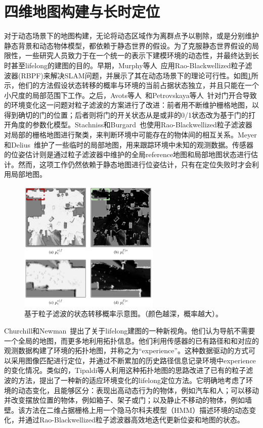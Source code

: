 \section{四维地图构建与长时定位}
\label{subsec:4Dmapping}
对于动态场景下的地图构建，无论将动态区域作为离群点予以剔除，或是分别维护静态背景和动态物体模型，都依赖于静态世界的假设。为了克服静态世界假设的局限性，一些研究人员致力于在一个统一的表示下建模环境的动态性，并最终达到长时甚至lifelong的建图的目的。早期，Murphy等人~\cite{Murphy1999Bayesian}应用Rao-Blackwellized粒子滤波器(RBPF)来解决SLAM问题，并展示了其在动态场景下的理论可行性。如图\ref{fig:State transition probabilities}所示，他们的方法假设状态转移的概率与环境的当前占据状态独立，并且只能在一个小尺度的局部范围下工作。之后，Avots等人~\cite{Avots2002A}和Petrovskaya等人~\cite{Petrovskaya2007Probabilistic}针对门开合导致的环境变化这一问题对粒子滤波的方案进行了改进：前者用不断维护栅格地图，以得到确切的门的位置；后者则将门的开关状态从是或非的0/1状态改为基于门的打开角度的参数化模型。Stachniss和Burgard~\cite{Stachniss2005Mobile}也使用Rao-Blackwellized粒子滤波器对局部的栅格地图进行聚类，来判断环境中可能存在的物体间的相互关系。Meyer和Delius~\cite{Meyer2010Temporary}维护了一些临时的局部地图，用来跟踪环境中未知的观测数据。传感器的位姿估计则是通过粒子滤波器中维护的全局reference地图和局部地图状态进行估计。然而，这项工作仍然依赖于静态地图进行位姿估计，只有在定位失败时才会利用局部地图。

\begin{figure}[htbp]
	\centering
	\includegraphics[width=0.6\textwidth]{figs/2-3/filter.png}
	\caption{基于粒子滤波的状态转移概率示意图。（颜色越深，概率越大）。}
	\label{fig:State transition probabilities}
\end{figure}

Churchill和Newman~\cite{Churchill2012Practice}提出了关于lifelong建图的一种新视角。他们认为导航不需要一个全局的地图，而更多地利用拓扑信息。他们利用传感器的已有路径和和对应的观测数据构建了环境的拓扑地图，并称之为“experience”。这种数据驱动的方式可以采用图像匹配进行定位，并通过不断累加的历史路径信息记录环境中experience的变化情况。类似的，Tipaldi等人\cite{Tipaldi2013Lifelong}利用这种拓扑地图的思路改进了已有的粒子滤波的方法，提出了一种新的适应环境变化的lifelong定位方法。它明确地考虑了环境的动态变化，且能够区分：表现出高动态行为的物体，例如汽车和人；可以移动并改变摆放位置的物体，例如箱子、架子或门；以及静止不移动的物体，例如墙壁。该方法在二维占据栅格上用一个隐马尔科夫模型（HMM）描述环境的动态变化，并通过Rao-Blackwellized粒子滤波器高效地迭代更新位姿和地图的状态。

